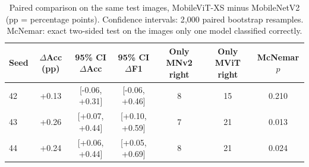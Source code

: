 \begin{table}[!t]
\centering
\footnotesize
\caption{Paired comparison on the same test images, MobileViT-XS minus MobileNetV2 (pp = percentage points). Confidence intervals: 2{,}000 paired bootstrap resamples. McNemar: exact two-sided test on the images only one model classified correctly.}
\label{tab:stats}
\begin{tabular}{lcccccc}
\toprule
Seed & $\Delta$Acc (pp) & 95\% CI $\Delta$Acc & 95\% CI $\Delta$F1 & Only MNv2 right & Only MViT right & McNemar $p$ \\
\midrule
42 & +0.13 & [-0.06, +0.31] & [-0.06, +0.46] & 8 & 15 & 0.210 \\
43 & +0.26 & [+0.07, +0.44] & [+0.10, +0.59] & 7 & 21 & 0.013 \\
44 & +0.24 & [+0.06, +0.44] & [+0.05, +0.69] & 8 & 21 & 0.024 \\
\bottomrule
\end{tabular}
\end{table}
